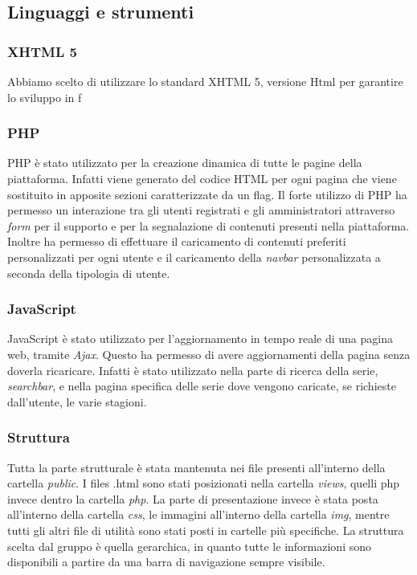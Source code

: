 \subsection{Linguaggi e strumenti}

\subsubsection{XHTML 5}
Abbiamo scelto di utilizzare lo standard XHTML 5, versione Html per garantire lo sviluppo in f

\subsubsection{PHP}
PHP è stato utilizzato per la creazione dinamica di tutte le pagine della piattaforma. Infatti viene generato del codice HTML per ogni pagina che viene sostituito in apposite sezioni caratterizzate da un flag. Il forte utilizzo di PHP ha permesso un interazione tra gli utenti registrati e gli amministratori attraverso \textit{form} per il supporto e per la segnalazione di contenuti presenti nella piattaforma. Inoltre ha permesso di effettuare il caricamento di contenuti preferiti personalizzati per ogni utente e il caricamento della \textit{navbar} personalizzata a seconda della tipologia di utente. 

\subsubsection{JavaScript}
JavaScript è stato utilizzato per l'aggiornamento in tempo reale di una pagina web, tramite \textit{Ajax}. Questo ha permesso di avere aggiornamenti della pagina senza doverla ricaricare. Infatti è stato utilizzato nella parte di ricerca della serie,  \textit{searchbar}, e nella pagina specifica delle serie dove vengono caricate, se richieste dall'utente, le varie stagioni. 

\subsubsection{Struttura}
Tutta la parte strutturale è stata mantenuta nei file presenti all'interno della cartella \textit{public}. I files .html sono stati posizionati nella cartella \textit{views}, quelli php invece dentro la cartella \textit{php}. La parte di presentazione invece è stata posta all'interno della cartella \textit{css}, le immagini all'interno della cartella \textit{img}, mentre tutti gli altri file di utilità sono stati posti in cartelle più specifiche. La struttura scelta dal gruppo è quella gerarchica, in quanto tutte le informazioni sono disponibili a partire da una barra di navigazione sempre visibile.

